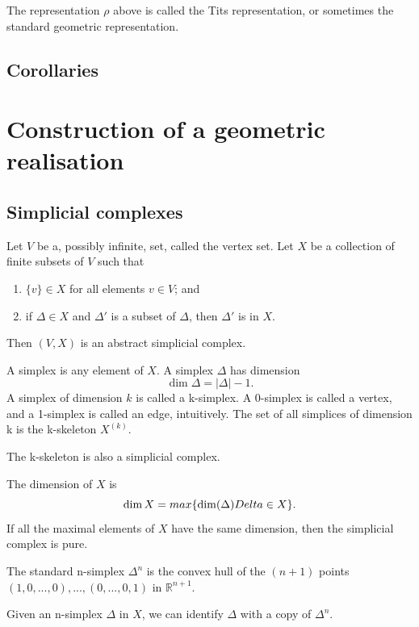 \documentclass[12pt]{article}
\begin{document}
\begin{definition}
    The representation $\rho$ above is called the Tits representation, or sometimes the standard geometric representation. 
\end{definition}

\subsection{Corollaries}

\bigbreak

\section{Construction of a geometric realisation}
\subsection{Simplicial complexes}
\begin{definition}
    Let $V$ be a, possibly infinite, set, called the vertex set. Let $X$ be a collection of finite subsets of $V$ such that 
    \begin{enumerate}
        \item $\{v\}\in X$ for all elements $v\in V$; and
        \item if $\Delta \in X$ and $\Delta'$ is a subset of $\Delta$, then $\Delta'$ is in $X$.
    \end{enumerate}
    Then $(V,X)$ is an abstract simplicial complex.
\end{definition}

\begin{definition}
    A simplex is any element of $X$. A simplex $\Delta$ has dimension 
    \[\dim \Delta = |\Delta| -1.\]
    A simplex of dimension $k$ is called a k-simplex. A 0-simplex is called a vertex, and a 1-simplex is called an edge, intuitively. The set of all simplices of dimension k is the k-skeleton $X^{(k)}.$ 
\end{definition}

\begin{lemma}
    The k-skeleton is also a simplicial complex. 
\end{lemma}

\begin{definition}
    The dimension of $X$ is
    \[\dim X = max\{\dim(\Delta)\\Delta \in X\}.\]
    If all the maximal elements of $X$ have the same dimension, then the simplicial complex is pure. 
\end{definition}
\begin{definition}
    The standard n-simplex $\Delta^n$ is the convex hull of the $(n+1)$ points $(1,0,...,0),...,(0,...,0,1)$ in $\mathbb{R}^{n+1}$.
\end{definition}
Given an n-simplex $\Delta$ in $X$, we can identify $\Delta$ with a copy of $\Delta^n$. 
\end{document}
